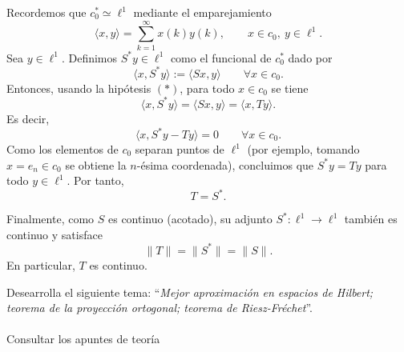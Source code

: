 \documentclass[12pt]{article}
\begin{document}
\begin{ejercicio}[2 puntos]
\begin{description}
\begin{itemize}
                Recordemos que $c_0^\ast\simeq \ell^1$ mediante el emparejamiento
                \begin{equation*}
                \langle x,y\rangle=\sum_{k=1}^\infty x(k)y(k),
                \qquad x\in c_0,\ y\in \ell^1.
                \end{equation*}
                Sea $y\in \ell^1$. Definimos $S^\ast y\in \ell^1$ como el funcional de $c_0^\ast$ dado por
                \begin{equation*}
                \langle x,S^\ast y\rangle:=\langle Sx,y\rangle
                \qquad \forall x\in c_0.
                \end{equation*}
                Entonces, usando la hipótesis $(\ast)$, para todo $x\in c_0$ se tiene
                \begin{equation*}
                \langle x,S^\ast y\rangle
                =\langle Sx,y\rangle
                =\langle x,Ty\rangle.
                \end{equation*}
                Es decir,
                \begin{equation*}
                \langle x,S^\ast y-Ty\rangle=0
                \qquad \forall x\in c_0.
                \end{equation*}
                Como los elementos de $c_0$ separan puntos de $\ell^1$ (por ejemplo, tomando $x=e_n\in c_0$
                se obtiene la $n$-ésima coordenada), concluimos que $S^\ast y=Ty$ para todo $y\in \ell^1$.
                Por tanto,
                \begin{equation*}
                T=S^\ast.
                \end{equation*}
                
                Finalmente, como $S$ es continuo (acotado), su adjunto $S^\ast:\ell^1\to \ell^1$ también es continuo y satisface
                \begin{equation*}
                \|T\|=\|S^\ast\|=\|S\|.
                \end{equation*}
                En particular, $T$ es continuo.
                
            \end{itemize}
        \end{description}
        
    \end{ejercicio}
    \newpage

    \begin{ejercicio}[4 puntos]
        Desearrolla el siguiente tema: ``\textit{Mejor aproximación en espacios de Hilbert; teorema de la proyección ortogonal; teorema de Riesz-Fréchet}''.
        \\
        \\
        Consultar los apuntes de teoría
    \end{ejercicio}
    \newpage
\end{document}
